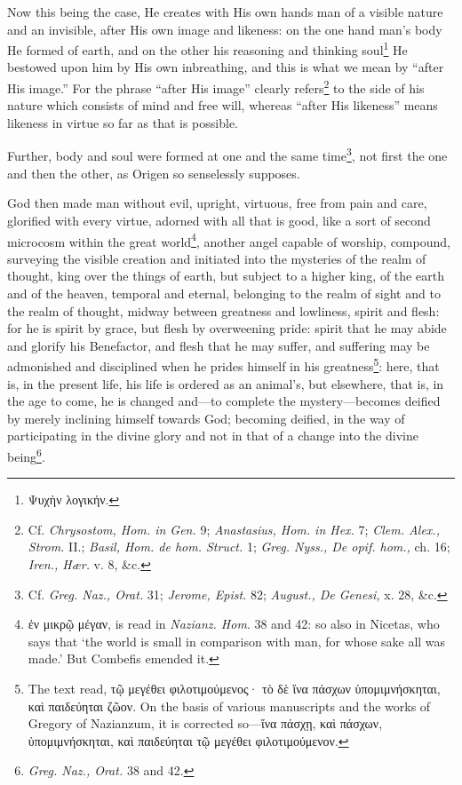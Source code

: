 Now this being the case, He creates with His own hands man of a visible nature and an invisible, after His own image and likeness: on the one hand man’s body He formed of earth, and on the other his reasoning and thinking soul\footnote{\textgreek{Ψυχὴν λογικήν}.} He bestowed upon him by His own inbreathing, and this is what we mean by “after His image.” For the phrase “after His image” clearly refers\footnote{Cf. \emph{Chrysostom, Hom. in Gen. }9; \emph{Anastasius, Hom. in Hex. }7; \emph{Clem. Alex., Strom. }II.; \emph{Basil, Hom. de hom. Struct. }1; \emph{Greg. Nyss., De opif. hom., }ch. 16; \emph{Iren., Hær. }v. 8, \&c.} to the side of his nature which consists of mind and free will, whereas “after His likeness” means likeness in virtue so far as that is possible.

Further, body and soul were formed at one and the same time\footnote{Cf. \emph{Greg. Naz., Orat. }31; \emph{Jerome, Epist. }82; \emph{August., De Genesi, }x. 28, \&c.}, not first the one and then the other, as Origen so senselessly supposes.

God then made man without evil, upright, virtuous, free from pain and care, glorified with every virtue, adorned with all that is good, like a sort of second microcosm within the great world\footnote{\textgreek{ἐν μικρῷ μέγαν}, is read in \emph{Nazianz. Hom}. 38 and 42: so also in Nicetas, who says that ‘the world is small in comparison with man, for whose sake all was made.’ But Combefis emended it.}, another angel capable of worship, compound, surveying the visible creation and initiated into the mysteries of the realm of thought, king over the things of earth, but subject to a higher king, of the earth and of the heaven, temporal and eternal, belonging to the realm of sight and to the realm of thought, midway between greatness and lowliness, spirit and flesh: for he is spirit by grace, but flesh by overweening pride: spirit that he may abide and glorify his Benefactor, and flesh that he may suffer, and suffering may be admonished and disciplined when he prides himself in his greatness\footnote{The text read, \textgreek{τῷ μεγέθει φιλοτιμούμενος· τὸ δὲ ἵνα πάσχων ὑπομιμνήσκηται, καὶ παιδεύηται ζῶον}. On the basis of various manuscripts and the works of Gregory of Nazianzum, it is corrected so—\textgreek{ἵνα πάσχῃ, καὶ πάσχων, ὑπομιμνήσκηται, καὶ παιδεύηται τῷ μεγέθει φιλοτιμούμενον}.}: here, that is, in the present life, his life is ordered as an animal’s, but elsewhere, that is, in the age to come, he is changed and—to complete the mystery—becomes deified by merely inclining himself towards God; becoming deified, in the way of participating in the divine glory and not in that of a change into the divine being\footnote{\emph{Greg. Naz., Orat. }38 and 42.}.

